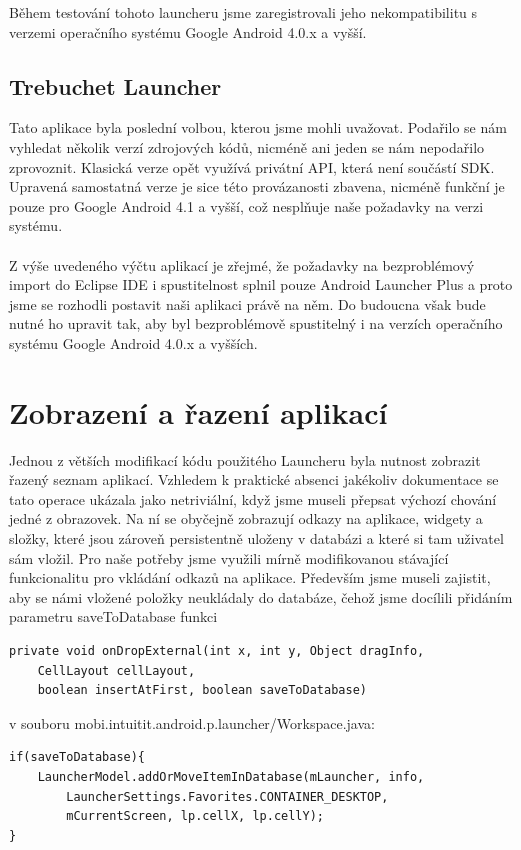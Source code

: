 \documentclass[thesis=M,czech]{FITthesis}[2012/06/26]
\begin{document}
Během testování tohoto launcheru jsme zaregistrovali jeho nekompatibilitu s verzemi operačního systému Google Android 4.0.x a vyšší.

\subsection{Trebuchet Launcher}
Tato aplikace byla poslední volbou, kterou jsme mohli uvažovat. Podařilo se nám vyhledat několik verzí zdrojových kódů, nicméně ani jeden se nám nepodařilo zprovoznit. Klasická verze opět využívá privátní API, která není součástí SDK. Upravená samostatná verze je sice této provázanosti zbavena, nicméně funkční je pouze pro Google Android 4.1 a vyšší, což nesplňuje naše požadavky na verzi systému.
\\\\
Z výše uvedeného výčtu aplikací je zřejmé, že požadavky na bezproblémový import do Eclipse IDE i spustitelnost splnil pouze Android Launcher Plus a proto jsme se rozhodli postavit naši aplikaci právě na něm. Do budoucna však bude nutné ho upravit tak, aby byl bezproblémově spustitelný i na verzích operačního systému Google Android 4.0.x a vyšších.

\section{Zobrazení a řazení aplikací}
Jednou z větších modifikací kódu použitého Launcheru byla nutnost zobrazit řazený seznam aplikací. Vzhledem k praktické absenci jakékoliv dokumentace se tato operace ukázala jako netriviální, když jsme museli přepsat výchozí chování jedné z obrazovek. Na ní se obyčejně zobrazují odkazy na aplikace, widgety a složky, které jsou zároveň persistentně uloženy v databázi a které si tam uživatel sám vložil. Pro naše potřeby jsme využili mírně modifikovanou stávající funkcionalitu pro vkládání odkazů na aplikace. Především jsme museli zajistit, aby se námi vložené položky neukládaly do databáze, čehož jsme docílili přidáním parametru saveToDatabase funkci

\begin{verbatim}
private void onDropExternal(int x, int y, Object dragInfo, 
    CellLayout cellLayout,
    boolean insertAtFirst, boolean saveToDatabase)
\end{verbatim}
v souboru mobi.intuitit.android.p.launcher/Workspace.java:

\begin{verbatim}
if(saveToDatabase){
    LauncherModel.addOrMoveItemInDatabase(mLauncher, info,
        LauncherSettings.Favorites.CONTAINER_DESKTOP, 
        mCurrentScreen, lp.cellX, lp.cellY);
}
\end{verbatim}
\end{document}
